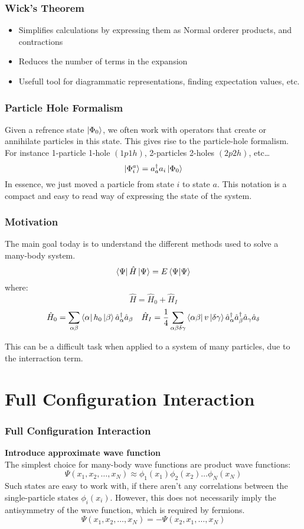 \documentclass[UKenglish,aspectratio=169,12pt]{beamer}
\begin{document}
\begin{frame}
    \frametitle{Wick's Theorem}
    
    \begin{itemize}
        \item Simplifies calculations by expressing them as Normal orderer products, and contractions 
        \item Reduces the number of terms in the expansion
        \item Usefull tool for diagrammatic representations, finding expectation values, etc.
    \end{itemize}
\end{frame}



\begin{frame}
    \frametitle{Particle Hole Formalism}
    Given a refrence state $\ket{\Phi_0}$, we often work with operators that create or annihilate particles in this state. This gives rise to the particle-hole formalism.\\
    For instance 1-particle 1-hole $(1p 1h)$, 2-particles 2-holes $(2p 2h)$, etc\dots
    \[
        \ket{\Phi_i^a} = a^\dagger_a a_i \ket{\Phi_0}
    \]
    In essence, we just moved a particle from state $i$ to state $a$.
    This notation is a compact and easy to read way of expressing the state of the system.
\end{frame}

\begin{frame}
    \frametitle{Motivation}
    The main goal today is to understand the different methods used to solve a many-body system.
    \[
        \bra{\Psi} \hat{H} \ket{\Psi} = E \bra{\Psi} \ket{\Psi}
    \]
    where:
    \[
        \hat{H} = \hat{H}_0 + \hat{H}_I
    \]
    \[
    \hat{H}_0 = \sum_{\alpha \beta}^{}\bra{ \alpha} h_0 \ket{\beta} \hat{a}^\dagger_\alpha \hat{a}_\beta \quad \hat{H}_I= \frac{1}{4} \sum_{\alpha\beta\delta\gamma}^{}\bra{\alpha\beta} v \ket{\delta\gamma} \hat{a}^\dagger_\alpha \hat{a}^\dagger_\beta \hat{a}_\gamma \hat{a}_\delta
    \]

    This can be a difficult task when applied to a system of many particles, due to the interraction term.
\end{frame}

\section{Full Configuration Interaction}

\begin{frame}
    \frametitle{Full Configuration Interaction}
    \textbf{Introduce approximate wave function}\\
    The simplest choice for many-body wave functions are product wave functions:
    \[
        \Psi(x_1,x_2,\dots ,x_N) \approx \phi_1(x_1)\phi_2(x_2)\dots \phi_N(x_N)
    \]
    Such states are easy to work with, if there aren't any correlations between the single-particle states $\phi_i(x_i)$. 
    However, this does not necessarily imply the antisymmetry of the wave function, which is required by fermions. 
    \[
        \Psi(x_1,x_2,\dots ,x_N) = - \Psi(x_2,x_1,\dots ,x_N)
    \]
\end{frame}
\end{document}
